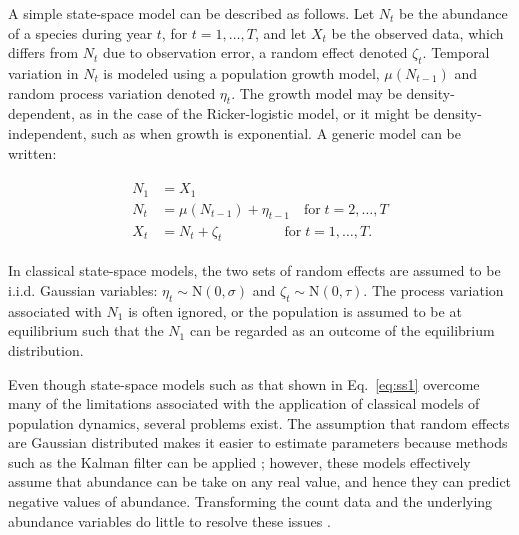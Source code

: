 \documentclass[12pt,english]{article}
\begin{document}
\begin{spacing}{1.9}
\begin{flushleft}
A simple state-space model can be described as follows.
Let $N_t$ be the abundance of a species during year $t$, for
$t=1,\hdots,T$, and let $X_t$ be
the observed data, which differs from $N_t$ due to observation error,
a random effect denoted $\zeta_t$. Temporal variation in $N_t$ is
modeled using a population growth model, $\mu(N_{t-1})$
and random process variation denoted $\eta_t$.
The growth model may be density-dependent, as in the case of the 
Ricker-logistic model, or it might be density-independent, such as when growth
is exponential. %
A generic model can be written: 
\begin{linenomath*}
\begin{gather}
  \label{eq:ss1}
  \begin{align}
    N_1 &= X_1 \nonumber \\
N_t &= \mu(N_{t-1}) + \eta_{t-1} \quad \text{for} \; %
t=2,\hdots,T  \\
X_t &= N_t + \zeta_t \qquad \qquad \;\, \text{for} \;
t=1,\hdots,T. \nonumber 
  \end{align}
\end{gather}
\end{linenomath*}
In classical
state-space models, the two sets of random effects
are assumed to be i.i.d. Gaussian variables: %
$\eta_t \sim \mathrm{N}(0, \sigma)$ and
$\zeta_t \sim \mathrm{N}(0, \tau)$. 
The process variation associated with $N_1$ is often ignored, or
the population is assumed to be at equilibrium such that the $N_1$ can
be regarded as an outcome of the equilibrium distribution.

Even though state-space models such as that shown in Eq.~\ref{eq:ss1}
overcome many of the limitations associated with the application of
classical models of population dynamics, 
several problems exist. 
The assumption that random effects are Gaussian distributed makes it
easier to estimate parameters because methods such as the Kalman
filter can be applied 
\citep{dennis_etal:2006}; however, 
these models effectively assume that abundance can be take on any
real value, and hence they can predict negative values of abundance. 
Transforming the count data and the underlying abundance variables 
do little to resolve these issues \citep{ohara_kotze:2010}.


\end{flushleft}
\end{spacing}
\end{document}
